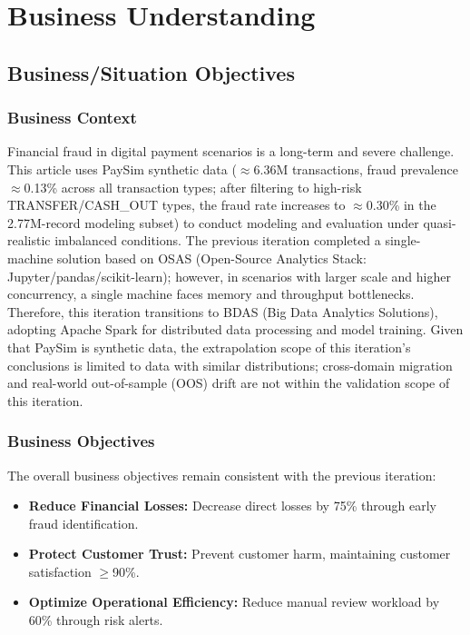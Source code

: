 \documentclass[sigplan,screen]{acmart}
\begin{document}
\maketitle

\section{Business Understanding}

\subsection{Business/Situation Objectives}

\subsubsection{Business Context}
Financial fraud in digital payment scenarios is a long-term and severe challenge. This article uses PaySim synthetic data ($\approx$6.36M transactions, fraud prevalence $\approx$0.13\% across all transaction types; after filtering to high-risk TRANSFER/CASH\_OUT types, the fraud rate increases to $\approx$0.30\% in the 2.77M-record modeling subset) to conduct modeling and evaluation under quasi-realistic imbalanced conditions. The previous iteration completed a single-machine solution based on OSAS (Open-Source Analytics Stack: Jupyter/\allowbreak pandas/\allowbreak scikit-learn); however, in scenarios with larger scale and higher concurrency, a single machine faces memory and throughput bottlenecks. Therefore, this iteration transitions to BDAS (Big Data Analytics Solutions), adopting Apache Spark for distributed data processing and model training. Given that PaySim is synthetic data, the extrapolation scope of this iteration's conclusions is limited to data with similar distributions; cross-domain migration and real-world out-of-sample (OOS) drift are not within the validation scope of this iteration.

\subsubsection{Business Objectives}
The overall business objectives remain consistent with the previous iteration:

\begin{itemize}
\item \textbf{Reduce Financial Losses:} Decrease direct losses by 75\% through early fraud identification.
\item \textbf{Protect Customer Trust:} Prevent customer harm, maintaining customer satisfaction $\geq$90\%.
\item \textbf{Optimize Operational Efficiency:} Reduce manual review workload by 60\% through risk alerts.
\end{itemize}
\end{document}
